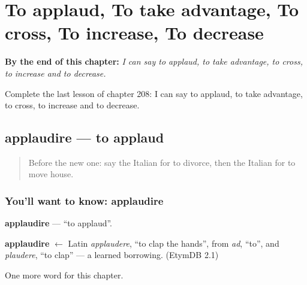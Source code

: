 
\chapter{To applaud, To take advantage, To cross, To increase, To decrease}
\label{ch:it-to-applaud-to-take-advantage-to-cross-to-increase-to-decrease}

\begin{chapteropening}
\textbf{By the end of this chapter:} \emph{I can say to applaud, to take advantage, to cross, to increase and to decrease.}

Complete the last lesson of chapter 208: I can say to applaud, to take advantage, to cross, to increase and to decrease.
\end{chapteropening}

\section[applaudire]{applaudire — to applaud}

\label{lesson:IT-C208-applaudire}



\begin{quote}
Before the new one: say the Italian for to divorce, then the Italian for to move house.
\end{quote}

\subsection*{You'll want to know: applaudire}
\textbf{applaudire} — \textquotedblleft{}to applaud\textquotedblright{}.

\begin{cousinweb}
\textbf{applaudire} $\leftarrow$ Latin \emph{applaudere}, \textquotedblleft{}to clap the hands\textquotedblright{}, from \emph{ad}, \textquotedblleft{}to\textquotedblright{}, and \emph{plaudere}, \textquotedblleft{}to clap\textquotedblright{} — a learned borrowing. (EtymDB 2.1)
\end{cousinweb}

\begin{grammarlens}[title={What you've built}]
One more word for this chapter.
\end{grammarlens}


